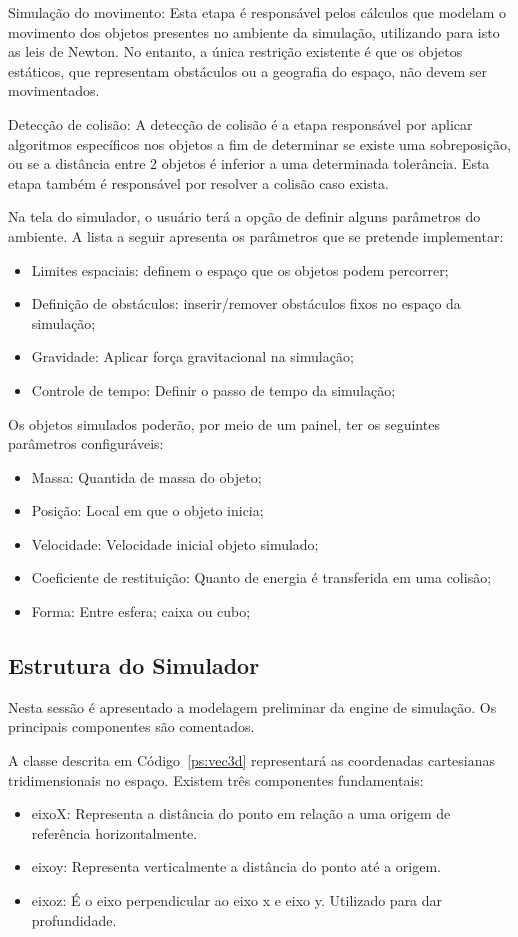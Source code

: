 Simulação do movimento: Esta etapa é responsável pelos cálculos que modelam o movimento dos objetos presentes no ambiente da simulação, utilizando para isto as leis de Newton. No entanto, a única restrição existente é que os objetos estáticos, que representam obstáculos ou a geografia do espaço, não devem ser movimentados.

Detecção de colisão: A detecção de colisão é a etapa responsável por aplicar algoritmos específicos nos objetos a fim de determinar se existe uma sobreposição, ou se a distância entre 2 objetos é inferior a uma determinada tolerância. Esta etapa também é responsável por resolver a colisão caso exista. 

Na tela do simulador, o usuário terá a opção de definir alguns parâmetros do ambiente. A lista a seguir apresenta os parâmetros que se pretende implementar:
\begin{itemize}
  \item Limites espaciais: definem o espaço que os objetos podem percorrer;
  \item Definição de obstáculos: inserir/remover obstáculos fixos no espaço da simulação;
  \item Gravidade: Aplicar força gravitacional na simulação;
  \item Controle de tempo: Definir o passo de tempo da simulação;   
\end{itemize}
 
Os objetos simulados poderão, por meio de um painel, ter os seguintes parâmetros configuráveis: 
\begin{itemize}
\item Massa: Quantida de massa do objeto; 
\item Posição: Local em que o objeto inicia;
\item Velocidade: Velocidade inicial objeto simulado; 
\item Coeficiente de restituição: Quanto de energia é transferida em uma colisão;
\item Forma: Entre esfera; caixa ou cubo; 
\end{itemize}

\subsection{Estrutura do Simulador}
Nesta sessão é apresentado a modelagem preliminar da engine de simulação. Os principais componentes são comentados. 

A classe descrita em Código~\ref{ps:vec3d} representará as coordenadas cartesianas tridimensionais no espaço.
Existem três componentes fundamentais:
\begin{itemize}
  \item eixoX: Representa a distância do ponto em relação a uma origem de referência horizontalmente.
  \item eixoy: Representa verticalmente a distância do ponto até a origem.
  \item eixoz: É o eixo perpendicular ao eixo x e eixo y. Utilizado para dar profundidade.
\end{itemize}

